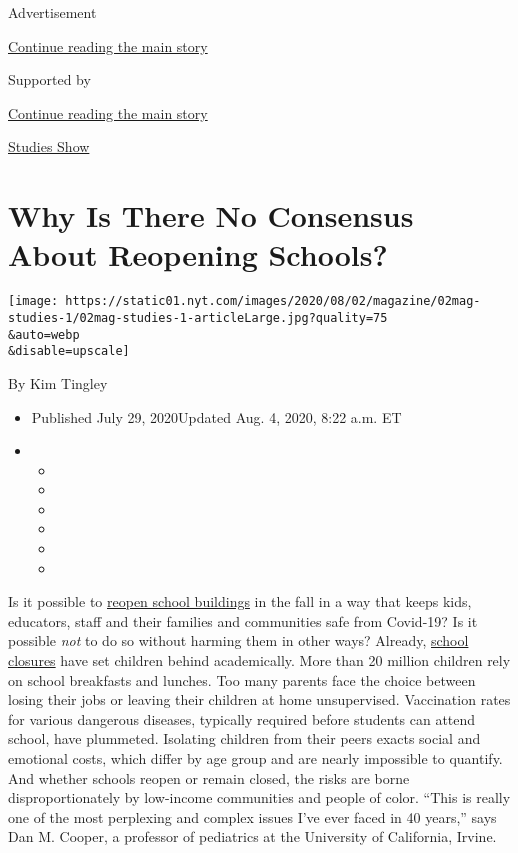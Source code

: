 Advertisement

\protect\hyperlink{after-top}{Continue reading the main story}

Supported by

\protect\hyperlink{after-sponsor}{Continue reading the main story}

\href{/column/studies-show}{Studies Show}

\hypertarget{why-is-there-no-consensus-about-reopening-schools}{%
\section{Why Is There No Consensus About Reopening
Schools?}\label{why-is-there-no-consensus-about-reopening-schools}}

\texttt{[image: https://static01.nyt.com/images/2020/08/02/magazine/02mag-studies-1/02mag-studies-1-articleLarge.jpg?quality=75\\\&auto=webp\\\&disable=upscale]}

By Kim Tingley

\begin{itemize}
\item
  Published July 29, 2020Updated Aug. 4, 2020, 8:22 a.m. ET
\item
  \begin{itemize}
  \item
  \item
  \item
  \item
  \item
  \item
  \end{itemize}
\end{itemize}

Is it possible to
\href{https://www.nytimes.com/2020/08/03/us/school-closing-coronavirus.html}{reopen
school buildings} in the fall in a way that keeps kids, educators, staff
and their families and communities safe from Covid-19? Is it possible
\emph{not} to do so without harming them in other ways? Already,
\href{https://www.nytimes.com/2020/07/29/health/covid-school-reopening.html}{school
closures} have set children behind academically. More than 20 million
children rely on school breakfasts and lunches. Too many parents face
the choice between losing their jobs or leaving their children at home
unsupervised. Vaccination rates for various dangerous diseases,
typically required before students can attend school, have plummeted.
Isolating children from their peers exacts social and emotional costs,
which differ by age group and are nearly impossible to quantify. And
whether schools reopen or remain closed, the risks are borne
disproportionately by low-income communities and people of color. ``This
is really one of the most perplexing and complex issues I've ever faced
in 40 years,'' says Dan M. Cooper, a professor of pediatrics at the
University of California, Irvine.

